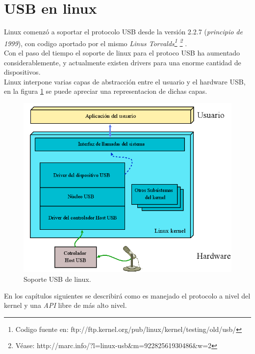 \clearpage
\section{USB en linux}

Linux comenz\'o a soportar el protocolo USB desde la versi\'on 2.2.7
(\emph{principio de 1999}), con codigo aportado por el mismo \emph{Linus
Torvalds\footnote{Codigo fuente
en: ftp://ftp.kernel.org/pub/linux/kernel/testing/old/usb/}
\footnote{V\'ease:
http://marc.info/?l=linux-usb\&m=92282561930486\&w=2}
}.\\

Con el paso del tiempo el soporte de linux para el protoco USB ha aumentado
considerablemente, y actualmente existen drivers para una enorme cantidad de
dispositivos.\\

Linux interpone varias capas de abstracci\'on entre el usuario y el hardware
USB, en la figura \ref{fig:usb_linux_layers} se puede apreciar una
representacion de dichas capas.

\begin{figure}
\centering
\includegraphics[scale=0.5]{./img/usb_linux_layers.png}
\caption{Soporte USB de linux.}
\label{fig:usb_linux_layers}
\end{figure}


En los cap\'itulos siguientes se describir\'a como es manejado el protocolo a
nivel del kernel y una \emph{API} libre de m\'as alto nivel.


